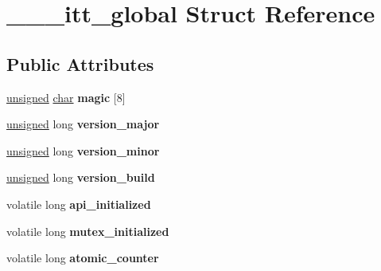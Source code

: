 \hypertarget{struct______itt__global}{}\section{\+\_\+\+\_\+\+\_\+itt\+\_\+global Struct Reference}
\label{struct______itt__global}
\subsection*{Public Attributes}
\begin{DoxyCompactItemize}
\item 
\mbox{\label{struct______itt__global_ab0e52e46d4af19f31c990bedcd6948df}} 
\mbox{\hyperlink{classunsigned}{unsigned}} \mbox{\hyperlink{classchar}{char}} {\bfseries magic} \mbox{[}8\mbox{]}
\item 
\mbox{\label{struct______itt__global_aaad26e96e84268d03a08cb840a2113c3}} 
\mbox{\hyperlink{classunsigned}{unsigned}} long {\bfseries version\+\_\+major}
\item 
\mbox{\label{struct______itt__global_a4487d06049ec27f22ad144eb2f57e0b5}} 
\mbox{\hyperlink{classunsigned}{unsigned}} long {\bfseries version\+\_\+minor}
\item 
\mbox{\label{struct______itt__global_a4ad1debe7bab64e55300de356e7f73a9}} 
\mbox{\hyperlink{classunsigned}{unsigned}} long {\bfseries version\+\_\+build}
\item 
\mbox{\label{struct______itt__global_adb68468b1a0fa798009ea4e128ae98f0}} 
volatile long {\bfseries api\+\_\+initialized}
\item 
\mbox{\label{struct______itt__global_a6c90634b5939d5718f63161edf0ee002}} 
volatile long {\bfseries mutex\+\_\+initialized}
\item 
\mbox{\label{struct______itt__global_a43a21d694a84edc516d1d4cc07d65313}} 
volatile long {\bfseries atomic\+\_\+counter}
\item 
\mbox{\label{struct______itt__global_ad09e87e07b15a780422e4ae565e06c5e}} 

\end{DoxyCompactItemize}
